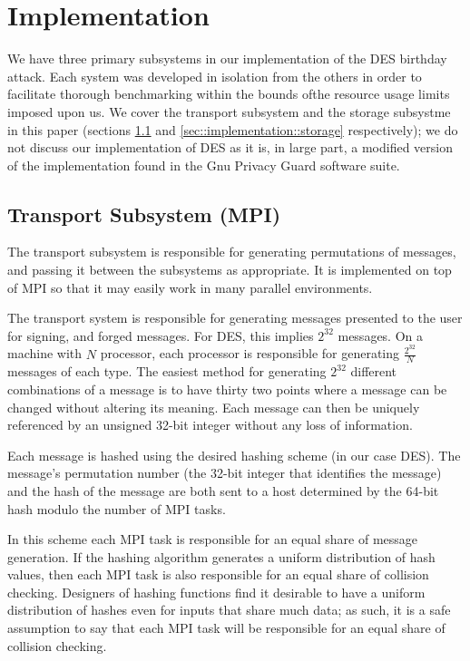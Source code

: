\section{Implementation}
\label{sec::implementation}
We have three primary subsystems in our implementation of the DES birthday
attack.  Each system was developed in isolation from the others in order to
facilitate thorough benchmarking within the bounds ofthe resource usage limits
imposed upon us.  We cover the transport subsystem and the storage subsystme in
this paper (sections \ref{sec::implementation::transport} and
\ref{sec::implementation::storage} respectively); we do not discuss our
implementation of DES as it is, in large part, a modified version of the
implementation found in the Gnu Privacy Guard software suite.

\subsection{Transport Subsystem (MPI)}
\label{sec::implementation::transport}
The transport subsystem is responsible for generating permutations of messages,
and passing it between the subsystems as appropriate.  It is implemented on top
of MPI so that it may easily work in many parallel environments.

The transport system is responsible for generating messages presented to the
user for signing, and forged messages.  For DES, this implies $2^{32}$ messages.
On a machine with $N$ processor, each processor is responsible for generating
$\frac{2^{32}}{N}$ messages of each type.  The easiest method for generating
$2^{32}$ different combinations of a message is to have thirty two points where
a message can be changed without altering its meaning.  Each message can then be
uniquely referenced by an unsigned 32-bit integer without any loss of
information.

Each message is hashed using the desired hashing scheme (in our case DES).  The
message's permutation number (the 32-bit integer that identifies the message)
and the hash of the message are both sent to a host determined by the 64-bit
hash modulo the number of MPI tasks.

In this scheme each MPI task is responsible for an equal share of message
generation.  If the hashing algorithm generates a uniform distribution of hash
values, then each MPI task is also responsible for an equal share of collision
checking.  Designers of hashing functions find it desirable to have a uniform
distribution of hashes even for inputs that share much data; as such, it is a
safe assumption to say that each MPI task will be responsible for an equal share
of collision checking.


